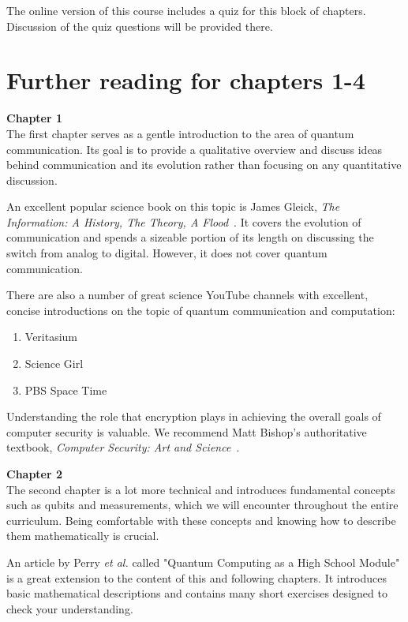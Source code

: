 The online version of this course includes a quiz for this block of chapters. Discussion of the quiz questions will be provided there.

\section*{Further reading for chapters 1-4}

{\bf Chapter 1}\\

The first chapter serves as a gentle introduction to the area of quantum communication. Its goal is to provide a qualitative overview and discuss ideas behind communication and its evolution rather than focusing on any quantitative discussion.

An excellent popular science book on this topic is James Gleick, \emph{The Information: A History, The Theory, A Flood}~\cite{gleick2012information}. It covers the evolution of communication and spends a sizeable portion of its length on discussing the switch from analog to digital. However, it does not cover quantum communication.

There are also a number of great science YouTube channels with excellent, concise introductions on the topic of quantum communication and computation:
\begin{enumerate}
    \item Veritasium
    \item Science Girl
    \item PBS Space Time
\end{enumerate}

Understanding the role that encryption plays in achieving the overall goals of computer security is valuable. We recommend Matt Bishop's authoritative textbook, \emph{Computer Security: Art and Science}~\cite{bishop2002art}.

{\bf Chapter 2}\\

The second chapter is a lot more technical and introduces fundamental concepts such as qubits and measurements, which we will encounter throughout the entire curriculum. Being comfortable with these concepts and knowing how to describe them mathematically is crucial.

An article by Perry \emph{et al.} called "Quantum Computing as a High School Module" is a great extension to the content of this and following chapters. It introduces basic mathematical descriptions and contains many short exercises designed to check your understanding.

